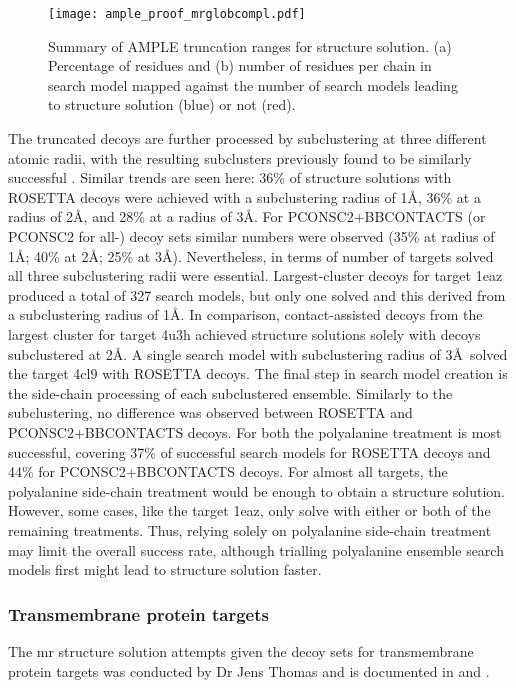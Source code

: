 \begin{figure}[H]
    \centering
    \texttt{[image: ample\_proof\_mrglobcompl.pdf]}
    \caption[Summary of AMPLE truncation ranges for structure solution]{Summary of AMPLE truncation ranges for structure solution. (a) Percentage of residues and (b) number of residues per chain in search model mapped against the number of search models leading to structure solution (blue) or not (red).}
    \label{fig:ample_proof_mrglobcompl}
\end{figure}

The truncated decoys are further processed by subclustering at three different atomic radii, with the resulting subclusters previously found to be similarly successful \cite{Bibby2012-lm}. Similar trends are seen here: 36\% of structure solutions with ROSETTA decoys were achieved with a subclustering radius of 1\AA, 36\% at a radius of 2\AA, and 28\% at a radius of 3\AA. For PCONSC2+BBCONTACTS (or PCONSC2 for all-\textalpha) decoy sets similar numbers were observed (35\% at radius of 1\AA; 40\% at 2\AA; 25\% at 3\AA). Nevertheless, in terms of number of targets solved all three subclustering radii were essential. Largest-cluster decoys for target 1eaz produced a total of 327 search models, but only one solved and this derived from a subclustering radius of 1\AA. In comparison, contact-assisted decoys from the largest cluster for target 4u3h achieved structure solutions solely with decoys subclustered at 2\AA. A single search model with subclustering radius of 3\AA\ solved the target 4cl9 with ROSETTA decoys. The final step in search model creation is the side-chain processing of each subclustered ensemble. Similarly to the subclustering, no difference was observed between ROSETTA and PCONSC2+BBCONTACTS decoys. For both the polyalanine treatment is most successful, covering 37\% of successful search models for ROSETTA decoys and 44\% for PCONSC2+BBCONTACTS decoys. For almost all targets, the polyalanine side-chain treatment would be enough to obtain a structure solution.  However, some cases, like the target 1eaz, only solve with either or both of the remaining treatments.  Thus, relying solely on polyalanine side-chain treatment may limit the overall success rate, although trialling polyalanine ensemble search models first might lead to structure solution faster.

\subsubsection{Transmembrane protein targets}
The \gls{mr} structure solution attempts given the decoy sets for transmembrane protein targets was conducted by Dr Jens Thomas and is documented in \textcite{Thomas2017-qu} and \textcite{Thomas2017-sh}.

